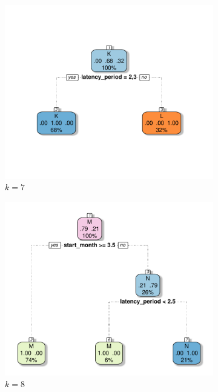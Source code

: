 \documentclass[10pt]{article}
\theoremstyle{definition}
\begin{document}
\begin{figure}[ht]
\begin{subfigure}[b]{.32\textwidth}
\includegraphics[width=\textwidth]{../clustering/results/agglomerative/cart_cKL_agg.pdf}
\caption{$k=7$}
\end{subfigure}
\begin{subfigure}[b]{.32\textwidth}
\includegraphics[width=\textwidth]{../clustering/results/agglomerative/cart_cMN_agg.pdf}
\caption{$k=8$}
\end{subfigure}
\begin{subfigure}[b]{.32\textwidth}

\end{subfigure}
\end{figure}
\end{document}
